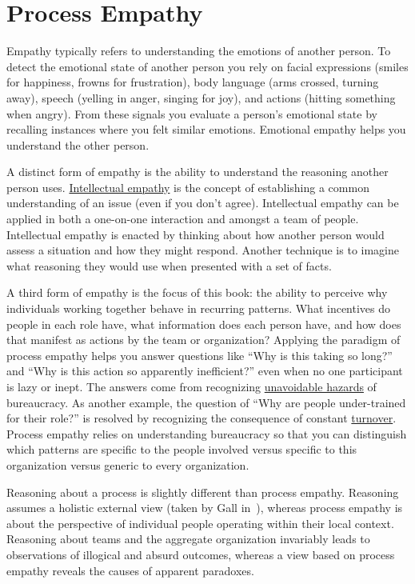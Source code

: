 \section{Process Empathy\label{sec:process-empathy}}

Empathy typically refers to understanding the emotions of another person. To detect the emotional state of another person you rely on facial expressions (smiles for happiness, frowns for frustration), body language (arms crossed, turning away), speech (yelling in anger, singing for joy), and actions (hitting something when angry). From these signals you evaluate a person's emotional state by recalling instances where you felt similar emotions. Emotional empathy helps you understand the other person. 

A distinct form of empathy is the ability to understand the reasoning another person uses.  
\hyperref[sec:intellectual-empathy]{Intellectual empathy} is the concept of establishing a common understanding of an issue (even if you don't agree). Intellectual empathy can be applied in both a one-on-one interaction and amongst a team of people. Intellectual empathy is enacted by thinking about how another person would assess a situation and how they might respond. Another technique is to imagine what reasoning they would use when presented with a set of facts. 


A third form of empathy is the focus of this book: the ability to perceive why individuals working together behave in recurring patterns. What incentives do people in each role have, what information does each person have, and how does that manifest as actions by the team or organization? Applying the paradigm of \gls{process empathy} helps you answer questions like ``Why is this taking so long?'' and ``Why is this action so apparently inefficient?'' even when no one participant is lazy or inept. The answers come from recognizing \hyperref[sec:unavoidable-hazards]{unavoidable hazards} of bureaucracy. As another example, the question of ``Why are people under-trained for their role?'' is resolved by recognizing the consequence of  constant \hyperref[sec:turnover]{turnover}. Process empathy relies on understanding bureaucracy so that you can distinguish which patterns are specific to the people involved versus specific to this organization versus generic to every organization.

Reasoning about a process is slightly different than process empathy. Reasoning assumes a holistic external view (taken by Gall in~\cite{2002_Gall}), whereas process empathy is about the perspective of individual people operating within their local context. Reasoning about teams and the aggregate organization invariably leads to observations of illogical and absurd outcomes, whereas a view based on process empathy reveals the causes of apparent paradoxes.

